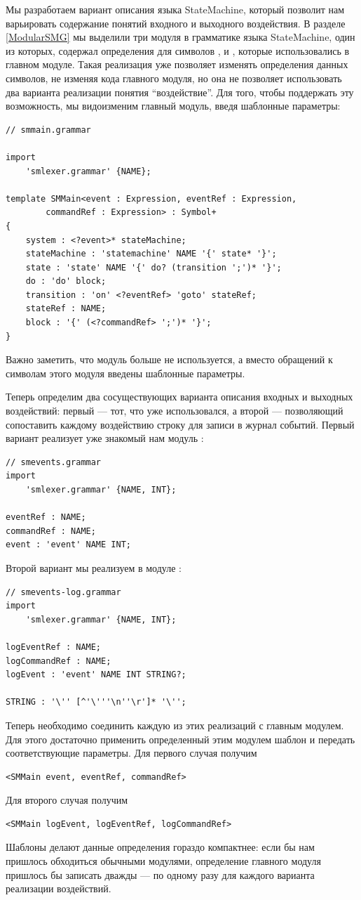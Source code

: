 Мы разработаем вариант описания языка StateMachine, который позволит нам варьировать содержание понятий входного и выходного воздействия. В разделе \ref{ModularSMG} мы выделили три модуля в грамматике языка StateMachine, один из которых,  содержал определения для символов ,  и , которые использовались в главном модуле. Такая реализация уже позволяет изменять определения данных символов, не изменяя кода главного модуля, но она не позволяет использовать  два варианта реализации понятия ``воздействие''. Для того, чтобы поддержать эту возможность, мы видоизменим главный модуль, введя шаблонные параметры:
\begin{lstlisting}
// smmain.grammar

import 
	'smlexer.grammar' {NAME};

template SMMain<event : Expression, eventRef : Expression, 
		commandRef : Expression> : Symbol+ 
{
	system : <?event>* stateMachine;
	stateMachine : 'statemachine' NAME '{' state* '}';
	state : 'state' NAME '{' do? (transition ';')* '}';
	do : 'do' block;
	transition : 'on' <?eventRef> 'goto' stateRef;
	stateRef : NAME;
	block : '{' (<?commandRef> ';')* '}';
}
\end{lstlisting}
Важно заметить, что модуль  больше не используется, а вместо обращений к символам этого модуля введены шаблонные параметры.

Теперь определим два сосуществующих варианта описания входных и выходных воздействий: первый --- тот, что уже использовался, а второй --- позволяющий сопоставить каждому воздействию строку для записи в журнал событий. Первый вариант реализует уже знакомый нам модуль :
\begin{lstlisting}
// smevents.grammar
import 
	'smlexer.grammar' {NAME, INT};
	
eventRef : NAME;
commandRef : NAME;
event : 'event' NAME INT;
\end{lstlisting}
Второй вариант мы реализуем в модуле :
\begin{lstlisting}
// smevents-log.grammar
import 
	'smlexer.grammar' {NAME, INT};
	
logEventRef : NAME;
logCommandRef : NAME;
logEvent : 'event' NAME INT STRING?;

STRING : '\'' [^'\'''\n''\r']* '\'';
\end{lstlisting}

Теперь необходимо соединить каждую из этих реализаций с главным модулем. Для этого достаточно применить определенный этим модулем шаблон и передать соответствующие параметры. Для первого случая получим
\begin{lstlisting}
<SMMain event, eventRef, commandRef>
\end{lstlisting}
Для второго случая получим
\begin{lstlisting}
<SMMain logEvent, logEventRef, logCommandRef>
\end{lstlisting}
Шаблоны делают данные определения гораздо компактнее: если бы нам пришлось обходиться обычными модулями, определение главного модуля пришлось бы записать дважды --- по одному разу для каждого варианта реализации воздействий.

